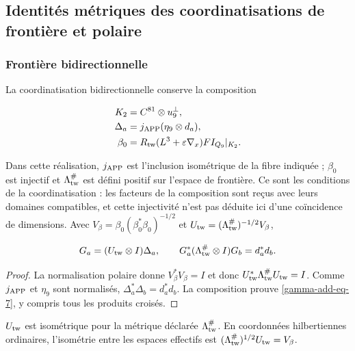 \subsection{Identités métriques des coordinatisations de frontière et polaire}
\label{gamma-add-sub-195}

\subsubsection{Frontière bidirectionnelle}
\label{gamma-add-sub-197}

La coordinatisation bidirectionnelle conserve la composition

\begin{equation}
\begin{aligned}
K_2&=\mathbb C^{81}\otimes u_9^\perp,\\
\Delta_a&=j_{\rm APP}(\eta_9\otimes d_a),\\
\beta_0&=R_{\rm tw}(L^3+\varepsilon\nabla_x)FI_{Q_9}|_{K_2}.
\end{aligned}
\label{gamma-add-display-16}
\end{equation}

Dans cette réalisation, \(j_{\rm APP}\) est l'inclusion isométrique de la fibre indiquée ; \(\beta_0\) est injectif et \(\Lambda_{\rm tw}^{\#}\) est défini positif sur l'espace de frontière. Ce sont les conditions de la coordinatisation : les facteurs de la composition sont reçus avec leurs domaines compatibles, et cette injectivité n'est pas déduite ici d'une coïncidence de dimensions.
Avec \(V_\beta=\beta_0(\beta_0^*\beta_0)^{-1/2}\) et
\(U_{\rm tw}=(\Lambda_{\rm tw}^{\#})^{-1/2}V_\beta\),

\begin{equation}
G_a=(U_{\rm tw}\otimes I)\Delta_a,\qquad
G_a^*(\Lambda_{\rm tw}^{\#}\otimes I)G_b=d_a^*d_b.
\label{gamma-add-eq-7}
\end{equation}

\begin{proof}
La normalisation polaire donne \(V_\beta^*V_\beta=I\) et donc
\(U_{\rm tw}^*\Lambda_{\rm tw}^{\#}U_{\rm tw}=I\).
Comme \(j_{\rm APP}\) et \(\eta_9\) sont normalisés,
\(\Delta_a^*\Delta_b=d_a^*d_b\). La composition prouve
\eqref{gamma-add-eq-7}, y compris tous les produits croisés.
\end{proof}
\(U_{\rm tw}\) est isométrique pour la métrique déclarée
\(\Lambda_{\rm tw}^{\#}\). En coordonnées hilbertiennes ordinaires,
l'isométrie entre les espaces effectifs est
\((\Lambda_{\rm tw}^{\#})^{1/2}U_{\rm tw}=V_\beta\).

